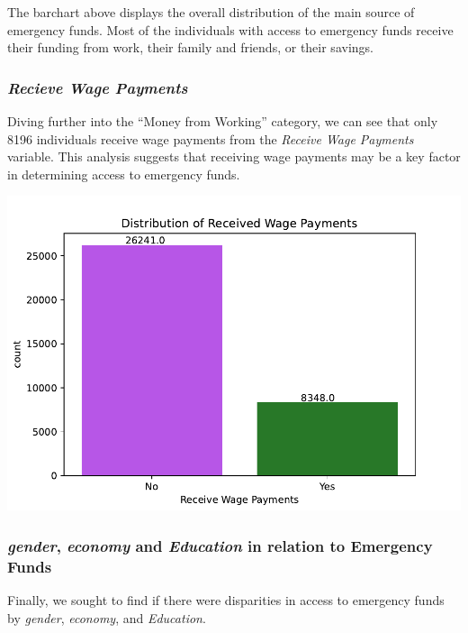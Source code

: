 \documentclass[water,article,submit,moreauthors,pdftex]{mdpi}
\begin{document}
The barchart above displays the overall distribution of the main source
of emergency funds. Most of the individuals with access to emergency
funds receive their funding from work, their family and friends, or
their savings.

\hypertarget{recieve-wage-payments}{%
\subsubsection{\texorpdfstring{\emph{Recieve Wage
Payments}}{Recieve Wage Payments}}\label{recieve-wage-payments}}

Diving further into the ``Money from Working'' category, we can see that
only 8196 individuals receive wage payments from the \emph{Receive Wage
Payments} variable. This analysis suggests that receiving wage payments
may be a key factor in determining access to emergency funds.

\includegraphics{term_paper_files/figure-latex/unnamed-chunk-16-15.pdf}

\hypertarget{gender-economy-and-education-in-relation-to-emergency-funds}{%
\subsubsection{\texorpdfstring{\emph{gender}, \emph{economy} and
\emph{Education} in relation to Emergency
Funds}{gender, economy and Education in relation to Emergency Funds}}\label{gender-economy-and-education-in-relation-to-emergency-funds}}

Finally, we sought to find if there were disparities in access to
emergency funds by \emph{gender}, \emph{economy}, and \emph{Education}.
\end{document}
